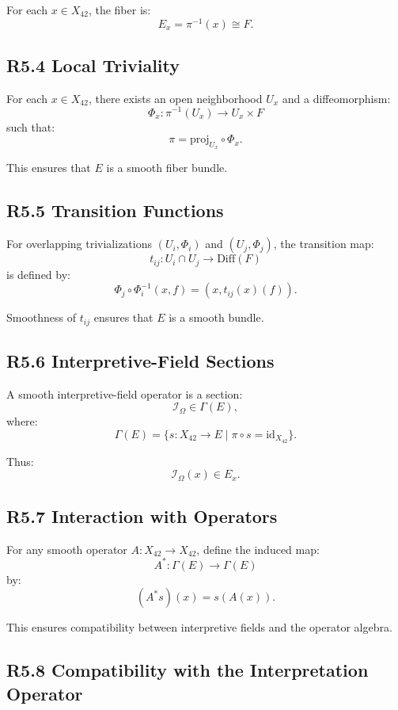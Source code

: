For each $x \in X_{42}$, the fiber is:
\[
E_x = \pi^{-1}(x) \cong F.
\]

\subsection*{R5.4 Local Triviality}

For each $x \in X_{42}$, there exists an open neighborhood $U_x$ and a
diffeomorphism:
\[
\Phi_x : \pi^{-1}(U_x) \to U_x \times F
\]
such that:
\[
\pi = \mathrm{proj}_{U_x} \circ \Phi_x.
\]

This ensures that $E$ is a smooth fiber bundle.

\subsection*{R5.5 Transition Functions}

For overlapping trivializations $(U_i, \Phi_i)$ and $(U_j, \Phi_j)$, the
transition map:
\[
t_{ij} : U_i \cap U_j \to \mathrm{Diff}(F)
\]
is defined by:
\[
\Phi_j \circ \Phi_i^{-1}(x, f) = (x, t_{ij}(x)(f)).
\]

Smoothness of $t_{ij}$ ensures that $E$ is a smooth bundle.

\subsection*{R5.6 Interpretive-Field Sections}

A smooth interpretive-field operator is a section:
\[
\mathcal{I}_{\Omega} \in \Gamma(E),
\]
where:
\[
\Gamma(E) = \{ s : X_{42} \to E \mid \pi \circ s = \mathrm{id}_{X_{42}} \}.
\]

Thus:
\[
\mathcal{I}_{\Omega}(x) \in E_x.
\]

\subsection*{R5.7 Interaction with Operators}

For any smooth operator $A : X_{42} \to X_{42}$, define the induced map:
\[
A^* : \Gamma(E) \to \Gamma(E)
\]
by:
\[
(A^* s)(x) = s(A(x)).
\]

This ensures compatibility between interpretive fields and the operator
algebra.

\subsection*{R5.8 Compatibility with the Interpretation Operator}

